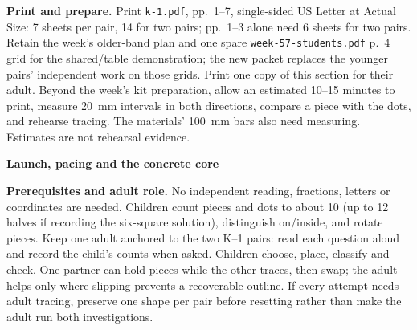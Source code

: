 \documentclass[11pt]{article}
\newcommand{\head}[1]{\par\textbf{\large #1}\par}
\begin{document}
\textbf{Print and prepare.} Print \texttt{k-1.pdf}, pp.~1--7, single-sided US Letter at Actual Size: 7 sheets per pair, 14 for two pairs; pp.~1--3 alone need 6 sheets for two pairs. Retain the week's older-band plan and one spare \texttt{week-57-students.pdf} p.~4 grid for the shared/table demonstration; the new packet replaces the younger pairs' independent work on those grids. Print one copy of this section for their adult. Beyond the week's kit preparation, allow an estimated 10--15 minutes to print, measure 20~mm intervals in both directions, compare a piece with the dots, and rehearse tracing. The materials' 100~mm bars also need measuring. Estimates are not rehearsal evidence.
\newpage
\head{Launch, pacing and the concrete core}
\textbf{Prerequisites and adult role.} No independent reading, fractions, letters or coordinates are needed. Children count pieces and dots to about 10 (up to 12 halves if recording the six-square solution), distinguish on/inside, and rotate pieces. Keep one adult anchored to the two K--1 pairs: read each question aloud and record the child's counts when asked. Children choose, place, classify and check. One partner can hold pieces while the other traces, then swap; the adult helps only where slipping prevents a recoverable outline. If every attempt needs adult tracing, preserve one shape per pair before resetting rather than make the adult run both investigations.
\end{document}

